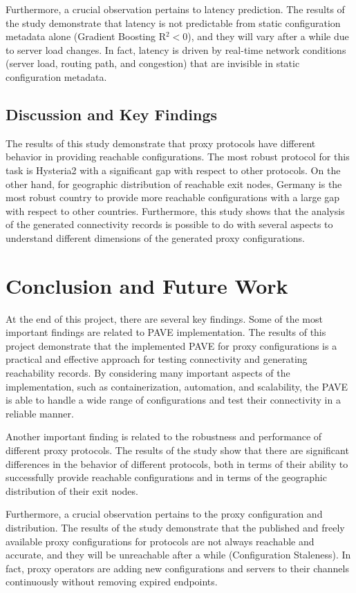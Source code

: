 \documentclass[10pt,conference]{IEEEtran}
\begin{document}
Furthermore, a crucial observation pertains to latency prediction.
The results of the study demonstrate that latency is not predictable from static configuration metadata alone (Gradient Boosting R$^2 < 0$), and they will vary after a while due to server load changes.
In fact, latency is driven by real-time network conditions (server load, routing path, and congestion) that are invisible in static configuration metadata.

\subsection{Discussion and Key Findings}
The results of this study demonstrate that proxy protocols have different behavior in providing reachable configurations.
The most robust protocol for this task is Hysteria2 with a significant gap with respect to other protocols.
On the other hand, for geographic distribution of reachable exit nodes, Germany is the most robust country to provide more reachable configurations with a large gap with respect to other countries.
Furthermore, this study shows that the analysis of the generated connectivity records is possible to do with several aspects to understand different dimensions of the generated proxy configurations.

\section{Conclusion and Future Work}
At the end of this project, there are several key findings.
Some of the most important findings are related to PAVE implementation.
The results of this project demonstrate that the implemented PAVE for proxy configurations is a practical and effective approach for testing connectivity and generating reachability records.
By considering many important aspects of the implementation, such as containerization, automation, and scalability, the PAVE is able to handle a wide range of configurations and test their connectivity in a reliable manner.

Another important finding is related to the robustness and performance of different proxy protocols.
The results of the study show that there are significant differences in the behavior of different protocols, both in terms of their ability to successfully provide reachable configurations and in terms of the geographic distribution of their exit nodes.

Furthermore, a crucial observation pertains to the proxy configuration and distribution.
The results of the study demonstrate that the published and freely available proxy configurations for protocols are not always reachable and accurate, and they will be unreachable after a while (Configuration Staleness).
In fact, proxy operators are adding new configurations and servers to their channels continuously without removing expired endpoints.
\end{document}
